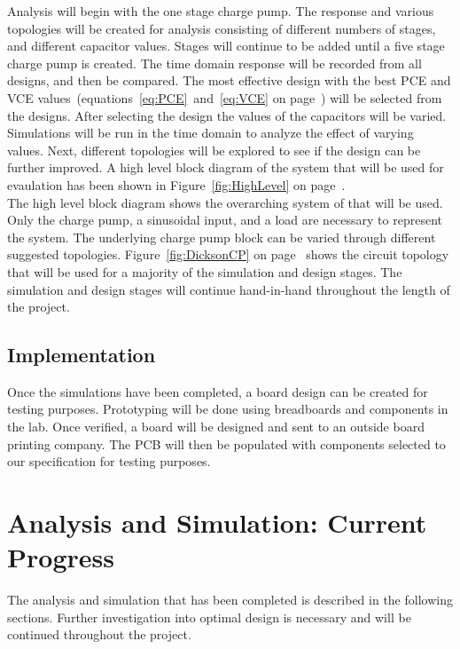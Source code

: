 \documentclass[12pt]{article}
\begin{document}
	\noindent Analysis will begin with the one stage charge pump. The response and various topologies will be created for analysis consisting of different numbers of stages, and different capacitor values. Stages will continue to be added until a five stage charge pump is created. The time domain response will be recorded from all designs, and then be compared. The most effective design with the best PCE and VCE values~(equations~\ref{eq:PCE}~and~\ref{eq:VCE} on page~\pageref{eq:PCE}) will be selected from the designs. After selecting the design the values of the capacitors will be varied. Simulations will be run in the time domain to analyze the effect of varying values. Next, different topologies will be explored to see if the design can be further improved. A high level block diagram of the system that will be used for evaulation has been shown in Figure~\ref{fig:HighLevel} on page~\pageref{fig:HighLevel}.\\

\noindent The high level block diagram shows the overarching system of that will be used. Only the charge pump, a sinusoidal input, and a load are necessary to represent the system. The underlying charge pump block can be varied through different suggested topologies. Figure~\ref{fig:DicksonCP}  on page~\pageref{fig:DicksonCP} shows the circuit topology that will be used for a majority of the simulation and design stages. The simulation and design stages will continue hand-in-hand throughout the length of the project.

	\subsection{Implementation}
	Once the simulations have been completed, a board design can be created for testing purposes. Prototyping will be done using breadboards and components in the lab. Once verified, a board will be designed and sent to an outside board printing company. The PCB will then be populated with components selected to our specification for testing purposes.
	
	\section{Analysis and Simulation: Current Progress}
	
	The analysis and simulation that has been completed is described in the following sections. Further investigation into optimal design is necessary and will be continued throughout the project.
	
\end{document}
